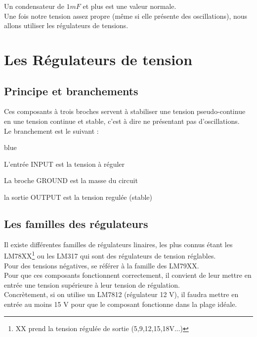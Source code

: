   Un condensateur de $1mF$ et plus est une valeur normale.\\
   Une fois notre tension assez propre (même si elle présente des oscillations), nous allons utiliser les régulateurs de tensions.

  \section{Les Régulateurs de tension}

  \subsection{Principe et branchements}
  Ces composants à trois broches servent à stabiliser une tension pseudo-continue en une tension continue et stable, c'est à dire ne présentant pas d'oscillations.\\


  Le branchement est le suivant : \\


  \begin{items}{blue}{\Triangle}
    \item L'entrée INPUT est la tension à réguler
    \item La broche GROUND est la masse du circuit
    \item la sortie OUTPUT est la tension regulée (stable)
\end{items}

\subsection{Les familles des régulateurs}

  Il existe différentes familles de régulateurs linaires, les plus connus étant les LM78XX\footnote{XX prend la tension régulée de sortie (5,9,12,15,18V...)} ou les LM317 qui sont des régulateurs de tension réglables.\\
  Pour des tensions négatives, se référer à la famille des LM79XX.\\

  Pour que ces composants fonctionnent correctement, il convient de leur mettre en entrée une tension supérieure à leur tension de régulation.\\

  Concrètement, si on utilise un LM7812 (régulateur 12 V), il faudra mettre en entrée au moins 15 V pour que le composant fonctionne dans la plage idéale.\\

